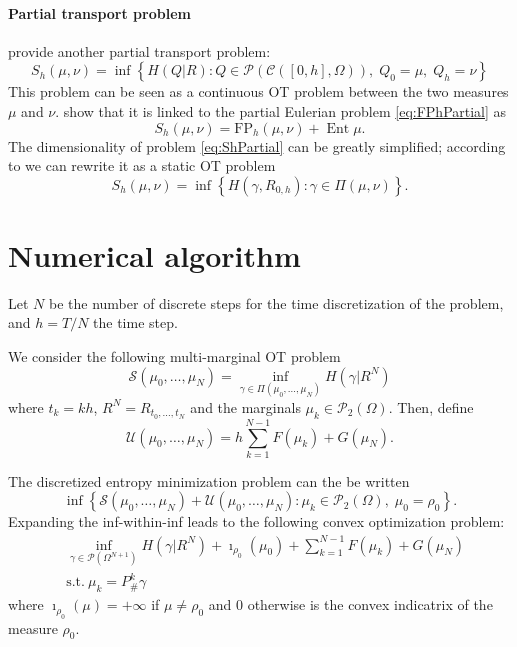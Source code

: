 \documentclass{article}
\newcommand{\calC}{\mathcal{C}}
\newcommand{\calP}{\mathcal{P}}
\newcommand{\calS}{\mathcal{S}}
\newcommand{\suchthat}{\mathrm{s.t.}}
\DeclareMathOperator{\Ent}{Ent}
\begin{document}
    \paragraph{Partial transport problem} \citeauthor{benamou2018entropy} provide another partial transport problem:
    \begin{equation}\label{eq:ShPartial}
    	S_h(\mu, \nu) =
    	\inf\left\{
    		H(Q|R) : Q\in\calP(\calC([0,h], \Omega)),
    		\; Q_0 = \mu,\; Q_h = \nu
    	\right\}
    \end{equation}
    This problem can be seen as a continuous OT problem between the two measures $\mu$ and $\nu$. \textcite{benamou2018entropy} show that it is linked to the partial Eulerian problem \eqref{eq:FPhPartial} as
    \[
    	S_h(\mu,\nu) = \mathrm{FP}_h(\mu,\nu) + \Ent \mu.
    \]
    The dimensionality of problem \eqref{eq:ShPartial} can be greatly simplified; according to \cite{benamou2018entropy} we can rewrite it as a static OT problem
    \begin{equation}
    	S_h(\mu, \nu) = \inf\left\{ H(\gamma, R_{0,h}) : \gamma \in \Pi(\mu, \nu) \right\}.
    \end{equation}
    
    
    
    \section{Numerical algorithm}
    
    
    Let $N$ be the number of discrete steps for the time discretization of the problem, and $h=T/N$ the time step.
    
    We consider the following multi-marginal OT problem
    \begin{equation}
    	\calS(\mu_0,\ldots,\mu_N) =
    	\inf_{\gamma \in \Pi(\mu_0, \ldots, \mu_N)}
    	H(\gamma|R^N)
    \end{equation}
    where $t_k = kh$, $R^N = R_{t_0,\ldots,t_N}$ and the marginals $\mu_k \in \calP_2(\Omega)$.
    Then, define
    \[
    	\mathcal{U}(\mu_0,\ldots,\mu_N) = h\sum_{k=1}^{N-1} F(\mu_k) + G(\mu_N).
    \]
    
    The discretized entropy minimization problem can the be written
    \[
    	\inf\left\{
    	\calS(\mu_0, \ldots, \mu_N) +
    	\mathcal{U}(\mu_0, \ldots, \mu_N)
    	: \mu_k \in \calP_2(\Omega),\; \mu_0 = \rho_0
    	\right\}.
    \]
    Expanding the inf-within-inf leads to the following convex optimization problem:
    \begin{equation}
    \begin{aligned}
    	&\inf_{\gamma \in \calP(\Omega^{N+1})}
    	H(\gamma | R^N) + \imath_{\rho_0}(\mu_0) + \sum_{k=1}^{N-1} F(\mu_k) + G(\mu_N) \\
    	&\suchthat\ \mu_k = P^k_\#\gamma
    \end{aligned}
    \end{equation}
    where $\imath_{\rho_0}(\mu) = +\infty$ if $\mu\neq \rho_0$ and $0$ otherwise is the convex indicatrix of the measure $\rho_0$.
    
\end{document}
